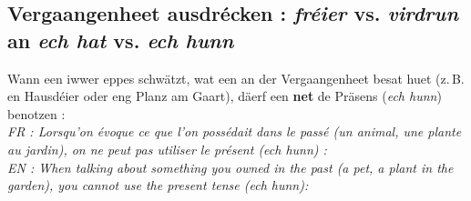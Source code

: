 \subsection{Vergaangenheet ausdrécken : \textit{fréier} vs. \textit{virdrun} an \textit{ech hat} vs. \textit{ech hunn}}

Wann een iwwer eppes schwätzt, wat een an der Vergaangenheet besat huet (z.\,B. en Hausdéier oder eng Planz am Gaart), däerf een \textbf{net} de Präsens (\textit{ech hunn}) benotzen : \\
\textit{FR : Lorsqu'on évoque ce que l'on possédait dans le passé (un animal, une plante au jardin), on ne peut pas utiliser le présent (\textit{ech hunn}) :} \\
\textit{EN : When talking about something you owned in the past (a pet, a plant in the garden), you cannot use the present tense (\textit{ech hunn}):}

